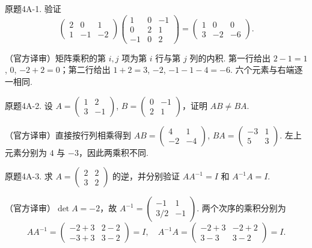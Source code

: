 \begin{exercise}\label{cw:bank-4A-1}原题4A-1. 验证
\[\begin{pmatrix}2&0&1\\1&-1&-2\end{pmatrix}\begin{pmatrix}1&0&-1\\0&2&1\\-1&0&2\end{pmatrix}=\begin{pmatrix}1&0&0\\3&-2&-6\end{pmatrix}.\]
\end{exercise}
\begin{solution}（官方译审）矩阵乘积的第 $i,j$ 项为第 $i$ 行与第 $j$ 列的内积. 第一行给出 $2-1=1$, $0$, $-2+2=0$；第二行给出 $1+2=3$, $-2$, $-1-1-4=-6$. 六个元素与右端逐一相同.\end{solution}
\begin{exercise}\label{cw:bank-4A-2}原题4A-2. 设 $A=\begin{pmatrix}1&2\\3&-1\end{pmatrix}$, $B=\begin{pmatrix}0&-1\\2&1\end{pmatrix}$，证明 $AB\ne BA$.\end{exercise}
\begin{solution}（官方译审）直接按行列相乘得到 $AB=\begin{pmatrix}4&1\\-2&-4\end{pmatrix}$, $BA=\begin{pmatrix}-3&1\\5&3\end{pmatrix}$. 左上元素分别为 $4$ 与 $-3$，因此两乘积不同.\end{solution}
\begin{exercise}\label{cw:bank-4A-3}原题4A-3. 求 $A=\begin{pmatrix}2&2\\3&2\end{pmatrix}$ 的逆，并分别验证 $AA^{-1}=I$ 和 $A^{-1}A=I$.\end{exercise}
\begin{solution}（官方译审）$\det A=-2$，故 $A^{-1}=\begin{pmatrix}-1&1\\3/2&-1\end{pmatrix}$. 两个次序的乘积分别为
\[AA^{-1}=\begin{pmatrix}-2+3&2-2\\-3+3&3-2\end{pmatrix}=I,
\quad A^{-1}A=\begin{pmatrix}-2+3&-2+2\\3-3&3-2\end{pmatrix}=I.\]
\end{solution}

